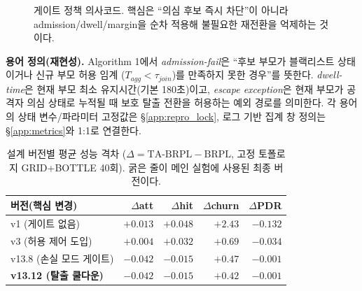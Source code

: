 \documentclass[12pt,a4paper]{article}
\begin{document}
\begin{figure}[t]
\centering
{}
\caption{게이트 정책 의사코드. 핵심은 ``의심 후보 즉시 차단''이 아니라
  admission/dwell/margin을 순차 적용해 불필요한 재전환을 억제하는 것이다.}
\label{fig:algo_gate}
\end{figure}

\noindent\textbf{용어 정의(재현성).}
Algorithm 1에서 \emph{admission-fail}은
``후보 부모가 블랙리스트 상태이거나 신규 부모 허용 임계
($T_{agg}<\tau_{join}$)를 만족하지 못한 경우''를 뜻한다.
\emph{dwell-time}은 현재 부모 최소 유지시간(기본 180초)이고,
\emph{escape exception}은 현재 부모가 공격자 의심 상태로 누적될 때
보호 탈출 전환을 허용하는 예외 경로를 의미한다.
각 용어의 상태 변수/파라미터 고정값은 \S\ref{app:repro_lock},
로그 기반 집계 창 정의는 \S\ref{app:metrics}와 1:1로 연결한다.

\begin{table}[t]
\centering
\caption{설계 버전별 평균 성능 격차
  ($\Delta = \text{TA-BRPL}-\text{BRPL}$, 고정 토폴로지 GRID+BOTTLE 40회).
  굵은 줄이 메인 실험에 사용된 최종 버전이다.}
\label{tab:versions}
\begin{tabular}{lrrrr}
\toprule
버전(핵심 변경) & $\Delta$att & $\Delta$hit & $\Delta$churn & $\Delta$PDR \\
\midrule
v1 (게이트 없음)              & $+0.013$ & $+0.048$ & $+2.43$ & $-0.132$ \\
v3 (허용 제어 도입)           & $+0.004$ & $+0.032$ & $+0.69$ & $-0.034$ \\
v13.8 (손실 모드 게이트)      & $-0.042$ & $-0.015$ & $+0.47$ & $-0.001$ \\
\textbf{v13.12 (탈출 쿨다운)} & $\mathbf{-0.042}$ & $\mathbf{-0.015}$
                               & $\mathbf{+0.42}$ & $\mathbf{-0.001}$ \\
\bottomrule
\end{tabular}
\end{table}
\end{document}

